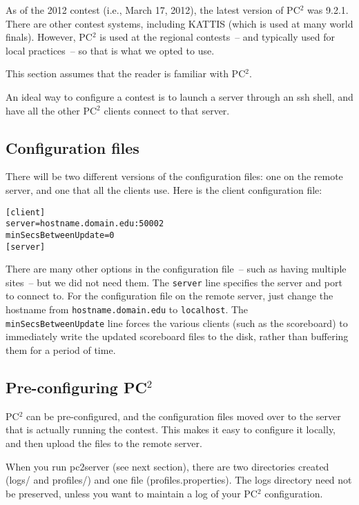 As of the 2012 contest (i.e., March 17, 2012), the latest version of
PC$^2$ was 9.2.1.  There are other contest systems, including KATTIS
(which is used at many world finals).  However, PC$^2$ is used at the
regional contests~-- and typically used for local practices~-- so that is what
we opted to use.

This section assumes that the reader is familiar with PC$^2$.

An ideal way to configure a contest is to launch a server through an
ssh shell, and have all the other PC$^2$ clients connect to that
server.

\subsection{Configuration files}

There will be two different versions of the configuration files: one
on the remote server, and one that all the clients use.  Here is the
client configuration file:

\begin{verbatim}
[client]
server=hostname.domain.edu:50002
minSecsBetweenUpdate=0
[server]
\end{verbatim}

There are many other options in the configuration file~-- such as
having multiple sites~-- but we did not need them.  The {\tt server}
line specifies the server and port to connect to.  For the
configuration file on the remote server, just change the hostname from
{\tt hostname.domain.edu} to {\tt localhost}.  The {\tt
minSecsBetweenUpdate} line forces the various clients (such as the
scoreboard) to immediately write the updated scoreboard files to the
disk, rather than buffering them for a period of time.

\subsection{Pre-configuring PC$^2$}

PC$^2$ can be pre-configured, and the configuration files moved over
to the server that is actually running the contest.  This makes it
easy to configure it locally, and then upload the files to the remote
server.

When you run pc2server (see next section), there are two directories
created (logs/ and profiles/) and one file (profiles.properties).  The
logs directory need not be preserved, unless you want to maintain a
log of your PC$^2$ configuration.

